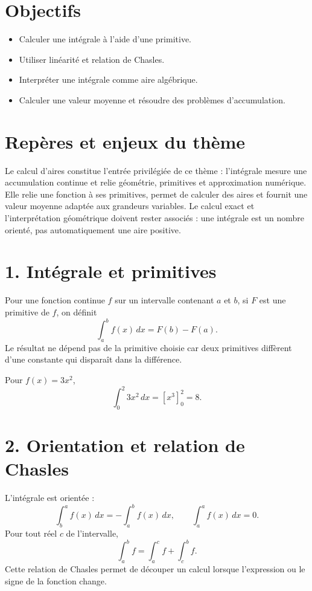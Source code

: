 
\section{Objectifs}
\begin{itemize}
\item Calculer une intégrale à l’aide d’une primitive.
\item Utiliser linéarité et relation de Chasles.
\item Interpréter une intégrale comme aire algébrique.
\item Calculer une valeur moyenne et résoudre des problèmes d’accumulation.
\end{itemize}

\section{Repères et enjeux du thème}
Le calcul d'aires constitue l'entrée privilégiée de ce thème : l’intégrale mesure une accumulation continue et relie géométrie, primitives et approximation numérique. Elle relie une fonction à ses primitives, permet de calculer des aires et fournit une valeur moyenne adaptée aux grandeurs variables. Le calcul exact et l’interprétation géométrique doivent rester associés : une intégrale est un nombre orienté, pas automatiquement une aire positive.

\section{1. Intégrale et primitives}
Pour une fonction continue $f$ sur un intervalle contenant $a$ et $b$, si $F$ est une primitive de $f$, on définit
\[
\int_a^b f(x)\,dx=F(b)-F(a).
\]
Le résultat ne dépend pas de la primitive choisie car deux primitives diffèrent d’une constante qui disparaît dans la différence.

\begin{exemple}
Pour $f(x)=3x^2$,
\[
\int_0^2 3x^2\,dx=[x^3]_0^2=8.
\]
\end{exemple}

\section{2. Orientation et relation de Chasles}
L’intégrale est orientée :
\[
\int_b^a f(x)\,dx=-\int_a^b f(x)\,dx,\qquad \int_a^a f(x)\,dx=0.
\]
Pour tout réel $c$ de l’intervalle,
\[
\int_a^b f=\int_a^c f+\int_c^b f.
\]
Cette relation de Chasles permet de découper un calcul lorsque l’expression ou le signe de la fonction change.

